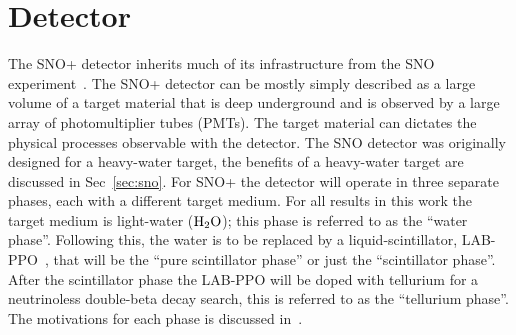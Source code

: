 
\chapter{Detector}
\label{sec:detector}

\ifpdf
    \graphicspath{{detector/figures/PNG/}{detector/figures/PDF/}{detector/figures/}}
\else
    \graphicspath{{detector/figures/EPS/}{detector/figures/}}
\fi


The SNO+ detector inherits much of its infrastructure from the SNO
experiment~\citep{sno_detector_paper}.
The SNO+ detector can be mostly simply described as a large volume of a
target material that is deep underground and is observed by a large array of
photomultiplier tubes (PMTs).
The target material can dictates the physical processes
observable with the detector.
The SNO detector was originally designed for a heavy-water
target, the benefits of a heavy-water target are discussed in Sec~\ref{sec:sno}.
For SNO+ the detector will operate in three separate phases, each with a different
target medium.
For all results in this work the target medium is light-water ($\ce{H_{2}O}$);
this phase is referred to as the ``water phase''.
Following this, the water is to be replaced by a liquid-scintillator,
LAB-PPO~\citep{mchen_labppo}, that will be the ``pure scintillator phase'' or
just the ``scintillator phase''.
After the scintillator phase the LAB-PPO will be doped with tellurium for
a neutrinoless double-beta decay search, this is referred to as the ``tellurium phase''.
The motivations for each phase is discussed in~\citep{snop_status_prospects}.


